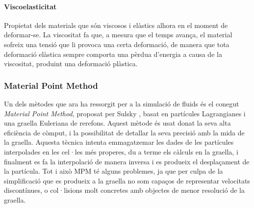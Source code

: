 \documentclass[a4paper]{report}
\begin{document}
	\paragraph{Viscoelasticitat} Propietat dels materials que són viscosos i elàstics alhora en el moment de deformar-se. La viscositat fa que, a mesura que el temps avança, el material sofreix una tensió que li provoca una certa deformació, de manera que tota deformació elàstica sempre comporta una pèrdua d'energia a causa de la viscositat, produint una deformació plàstica.
	
	\subsubsection[MPM]{Material Point Method}
	Un dels mètodes que ara ha ressorgit per a la simulació de fluids és el conegut \textit{Material Point Method}, proposat per Sulsky \cite{Sulsky1995}, basat en partícules Lagrangianes i una graella Euleriana de rerefons. Aquest mètode és usat donat la seva alta eficiència de còmput, i la possibilitat de detallar la seva precisió amb la mida de la graella. \newline
	Aquesta tècnica intenta emmagatzemar les dades de les partícules interpolades en les cel·les més properes, du a terme els càlculs en la graella, i finalment es fa la interpolació de manera inversa i es produeix el desplaçament de la partícula. \newline
	Tot i això MPM té alguns problemes, ja que per culpa de la simplificació que es produeix a la graella no som capaços de representar velocitats discontínues, o col·lisions molt concretes amb objectes de menor resolució de la graella. 
	
\end{document}
